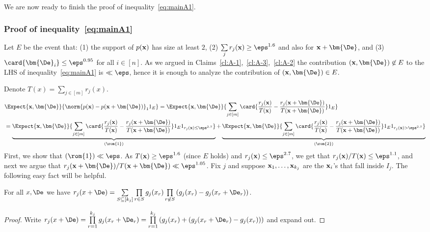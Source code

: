 We are now ready to finish the proof of inequality~\eqref{eq:mainA1}.
\subsubsection*{Proof of inequality~\eqref{eq:mainA1}}
Let $E$ be the event that:
(1) the support of $p({\bf x})$ has size at least $2$,
(2) $\sum\limits_{j} r_j({\bf x})\geq \eps^{1.6}$ and also for ${\bf x}+\bm{\De}$,
and (3) $\card{\bm{\De}_i}\leq \eps^{0.95}$ for all $i\in[n]$.
As we argued in Claims~\ref{cl:A-1},~\ref{cl:A-3},~\ref{cl:A-2} the contribution $({\bf x},\bm{\De})\not\in E$ to
the LHS of inequality~\eqref{eq:mainA1} is $\ll \eps$, hence it is enough to analyze the contribution of $({\bf x},\bm{\De})\in E$.


Denote $T(x) = \sum\limits_{j\in [m]} r_j(x)$.
\begin{align*}
&\Expect{{\bf x},\bm{\De}}{\norm{p({\bf x}) - p({\bf x}+\bm{\De})}_1 1_E}
= \Expect{{\bf x},\bm{\De}}{\sum\limits_{j\in [m]}\card{\frac{r_j({\bf x})}{T({\bf x})}-\frac{r_j({\bf x}+\bm{\De})}{T({\bf x}+\bm{\De})}} 1_E}\\
&= \underbrace{\Expect{{\bf x},\bm{\De}}{\sum\limits_{j\in [m]}\card{\frac{r_j({\bf x})}{T({\bf x})}-\frac{r_j({\bf x}+\bm{\De})}{T({\bf x}+\bm{\De})}}
1_E 1_{r_j({\bf x}) \leq \eps^{2.7}}}}_{(\rom{1})}
+\underbrace{\Expect{{\bf x},\bm{\De}}{\sum\limits_{j\in [m]}\card{\frac{r_j({\bf x})}{T({\bf x})}-\frac{r_j({\bf x}+\bm{\De})}{T({\bf x}+\bm{\De})}}
1_E 1_{r_j({\bf x}) >\eps^{2.7}}}}_{(\rom{2})}
\end{align*}
First, we show that $(\rom{1})\ll \eps$. As $T({\bf x})\geq \eps^{1.6}$ (since $E$ holds) and $r_j({\bf x})\leq \eps^{2.7}$, we get that
$r_j({\bf x})/T({\bf x})\leq \eps^{1.1}$, and next we argue that $r_j({\bf x}+\bm{\De})/T({\bf x}+\bm{\De})\ll \eps^{1.05}$.
Fix $j$ and suppose ${\bf x}_1,\ldots,{\bf x}_{k_j}$ are the ${\bf x}_i$'s that fall inside $I_j$. The following easy fact will be helpful.

\begin{fact}\label{fact:general}
  For all $x,\De$ we have
  $r_j(x+\De) = \sum\limits_{\substack{S\subseteq[k_j]}}{
  \prod\limits_{r\in S}{g_j(x_r)}
  \prod\limits_{r\not\in S}{(g_j(x_r)-g_j(x_r+\De_r))}}$.
\end{fact}
\begin{proof}
  Write $r_j(x+\De) =
  \prod\limits_{r=1}^{k_j} g_j(x_r+\De_r)
  =\prod\limits_{r=1}^{k_j}\left(g_j(x_r) + (g_j(x_r+\De_r)-g_j(x_r))\right)$
  and expand out.
\end{proof}

